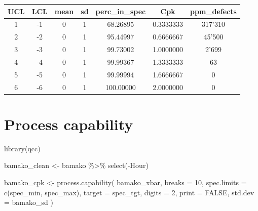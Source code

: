\documentclass[
]{book}
\newenvironment{Shaded}{\begin{snugshade}}{\end{snugshade}}
\newcommand{\AttributeTok}[1]{\textcolor[rgb]{0.77,0.63,0.00}{#1}}
\newcommand{\ConstantTok}[1]{\textcolor[rgb]{0.00,0.00,0.00}{#1}}
\newcommand{\DecValTok}[1]{\textcolor[rgb]{0.00,0.00,0.81}{#1}}
\newcommand{\FunctionTok}[1]{\textcolor[rgb]{0.00,0.00,0.00}{#1}}
\newcommand{\NormalTok}[1]{#1}
\newcommand{\OtherTok}[1]{\textcolor[rgb]{0.56,0.35,0.01}{#1}}
\newcommand{\SpecialCharTok}[1]{\textcolor[rgb]{0.00,0.00,0.00}{#1}}
\begin{document}
\begin{tabular}{c|c|c|c|c|c|c}
\hline
UCL & LCL & mean & sd & perc\_in\_spec & Cpk & ppm\_defects\\
\hline
1 & -1 & 0 & 1 & 68.26895 & 0.3333333 & 317'310\\
\hline
2 & -2 & 0 & 1 & 95.44997 & 0.6666667 & 45'500\\
\hline
3 & -3 & 0 & 1 & 99.73002 & 1.0000000 & 2'699\\
\hline
4 & -4 & 0 & 1 & 99.99367 & 1.3333333 & 63\\
\hline
5 & -5 & 0 & 1 & 99.99994 & 1.6666667 & 0\\
\hline
6 & -6 & 0 & 1 & 100.00000 & 2.0000000 & 0\\
\hline
\end{tabular}

\hypertarget{process-capability}{%
\section{Process capability}\label{process-capability}}

\begin{Shaded}
\begin{Highlighting}[]
\FunctionTok{library}\NormalTok{(qcc)}
\end{Highlighting}
\end{Shaded}

\begin{Shaded}
\begin{Highlighting}[]
\NormalTok{bamako\_clean }\OtherTok{\textless{}{-}}\NormalTok{ bamako }\SpecialCharTok{\%\textgreater{}\%} 
  \FunctionTok{select}\NormalTok{(}\SpecialCharTok{{-}}\NormalTok{Hour) }
\end{Highlighting}
\end{Shaded}

\begin{Shaded}
\begin{Highlighting}[]
\NormalTok{bamako\_cpk }\OtherTok{\textless{}{-}} \FunctionTok{process.capability}\NormalTok{(}
\NormalTok{  bamako\_xbar,}
  \AttributeTok{breaks =} \DecValTok{10}\NormalTok{,}
  \AttributeTok{spec.limits =} \FunctionTok{c}\NormalTok{(spec\_min, spec\_max),}
  \AttributeTok{target =}\NormalTok{ spec\_tgt,}
  \AttributeTok{digits =} \DecValTok{2}\NormalTok{,}
  \AttributeTok{print =} \ConstantTok{FALSE}\NormalTok{,}
  \AttributeTok{std.dev =}\NormalTok{ bamako\_sd}
\NormalTok{)}
\end{Highlighting}
\end{Shaded}
\end{document}
